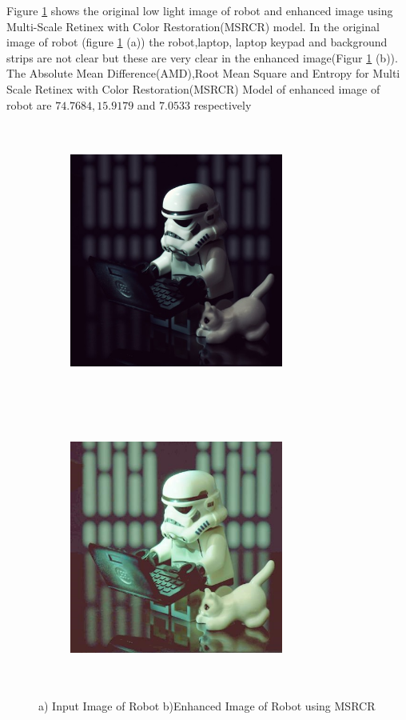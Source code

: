 Figure \ref{fig:msrcrRobot} shows the original low light image of robot and enhanced image using Multi-Scale Retinex with Color Restoration(MSRCR) model. In the original image of robot (figure \ref{fig:msrcrRobot} (a))  the robot,laptop, laptop keypad and background strips are not clear but these are very clear in the enhanced image(Figur \ref{fig:msrcrRobot} (b)). The Absolute Mean Difference(AMD),Root Mean Square and Entropy for Multi Scale Retinex with Color Restoration(MSRCR) Model of enhanced image of robot are $74.7684, 15.9179$ and $7.0533$ respectively      

\begin{figure}
	\begin{subfigure}{8cm}
		\centering    
    	\includegraphics[width=7cm,height=9cm,keepaspectratio]{images/ch5/robot_input.jpg}
    	\caption{} 
    \end{subfigure}
  	\begin{subfigure}{6cm}
  		\centering
  		\includegraphics[width=7cm,height=9cm,keepaspectratio]{images/ch5/robot_msrcr.jpg}
   		\caption{}
  	\end{subfigure}
  	\caption{a) Input Image of Robot b)Enhanced Image of Robot using MSRCR}
  	\label{fig:msrcrRobot}
\end{figure}


